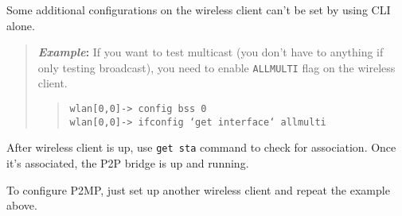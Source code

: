 \documentclass[10pt,fullpage]{article}
\newcommand{\mytt}[1]{{\texttt{#1}}}
\newcommand{\bv}{\begin{verse}}
\newcommand{\ev}{\end{verse}}
\newcommand{\clidemo}[1]{{\texttt{wlan[0,0]-> #1}}}
\newenvironment{example}{\begin{quote}\textbf{\textit{Example}:}}{\end{quote}}
\begin{document}
Some additional configurations on the wireless client can't be set 
by using CLI alone. 

\begin{example}
If you want to test multicast (you don't have to anything if only
testing broadcast), you need to enable \mytt{ALLMULTI} flag on the
wireless client.
  \bv
  \clidemo{config bss 0}\\
  \clidemo{ifconfig `get interface` allmulti}
  \ev
\end{example}

After wireless client is up, use \mytt{get sta} command to check for 
association. Once it's associated, the P2P bridge is up and running.

To configure P2MP, just set up another wireless client and repeat
the example above.
\end{document}

